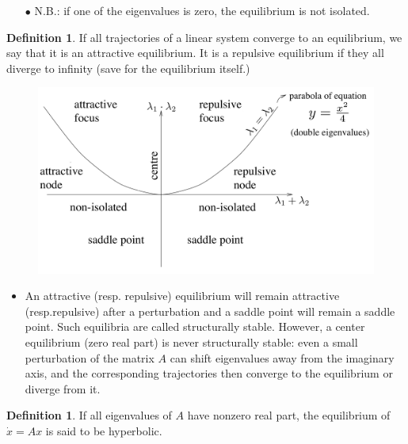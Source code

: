 \documentclass[12pt, openany]{report}
\theoremstyle{definition}
\newtheorem{definition}[thm]{Definition}
\begin{document}
\begin{itemize}
    \item [\(\bullet\)] N.B.: if one of the eigenvalues is zero, the equilibrium is not isolated.
\end{itemize}
\begin{definition}
    If all trajectories of a linear system converge to an equilibrium, we say that it is an attractive equilibrium. It is a repulsive equilibrium if they all diverge to infinity (save for the equilibrium itself.)
\end{definition}
\begin{figure}[H]
    \centering
    \includegraphics[width=.5\textwidth]{img/det_tr_2d.png}
\end{figure}
\begin{itemize}
    \item An attractive (resp. repulsive) equilibrium will remain attractive (resp.repulsive) after a perturbation and a saddle point will remain a saddle point. Such equilibria are called structurally stable. However, a center equilibrium (zero real part) is never structurally stable: even a small perturbation of the matrix \(A\) can shift eigenvalues away from the imaginary axis, and the corresponding trajectories then converge to the equilibrium or diverge from it.
\end{itemize}
\begin{definition}
    If all eigenvalues of \(A\) have nonzero real part, the equilibrium of \(\dot x=Ax\) is said to be hyperbolic.
\end{definition}
\end{document}
